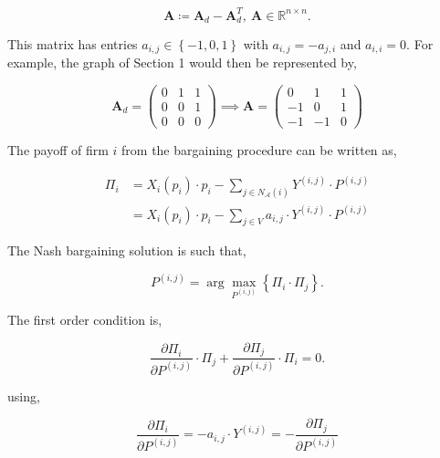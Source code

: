 \documentclass[american]{scrartcl}
\newcommand{\R}{\mathbb{R}}
\newcommand{\matr}[1]{\bm{#1}}
\newcommand{\set}[1]{\left\{#1\right\}}
\begin{document}
\begin{equation}
	\matr{A} \coloneqq \matr{A}_{d} - \matr{A}_{d}^T,  \ \matr{A} \in\R^{n\times n}.
\end{equation}

This matrix has entries $a_{i, j} \in \set{-1, 0, 1}$ with $a_{i, j} = - a_{j, i}$ and $a_{i, i} = 0$. For example, the graph of Section 1 would then be represented by,

\begin{equation}
	\matr{A}_d= \begin{pmatrix}
		0 & 1 & 1 \\
		0 & 0 & 1 \\
		0 & 0 & 0
	\end{pmatrix} \implies
	\matr{A} = \begin{pmatrix}
		0  & 1  & 1 \\
		-1 & 0  & 1 \\
		-1 & -1 & 0
	\end{pmatrix}
\end{equation}

The payoff of firm $i$ from the bargaining procedure can be written as,

\begin{equation}
	\begin{split}
		\Pi_i &= X_i(p_i)\cdot p_i - \sum_{j \in N_{\mathcal{A}}(i)} Y^{(i, j)} \cdot P^{(i, j)} \\
		&= X_i(p_i)\cdot p_i - \sum_{j \in V} a_{i, j} \cdot Y^{(i, j)} \cdot P^{(i, j)}
	\end{split}
\end{equation}

The Nash bargaining solution is such that,

\begin{equation}
	P^{(i, j)} = \arg \max_{P^{(i, j)}} \left\{\Pi_i \cdot \Pi_j \right\}.
\end{equation}

The first order condition is,

\begin{equation}
	\frac{\partial\Pi_i}{\partial P^{(i, j)}} \cdot \Pi_j + \frac{\partial\Pi_j}{\partial P^{(i, j)}} \cdot \Pi_i = 0.
\end{equation}

using,

\begin{equation}
	\frac{\partial\Pi_i}{\partial P^{(i, j)}} = - a_{i, j} \cdot Y^{(i, j)} = -\frac{\partial \Pi_j}{\partial P^{(i, j)}}
\end{equation}
\end{document}

